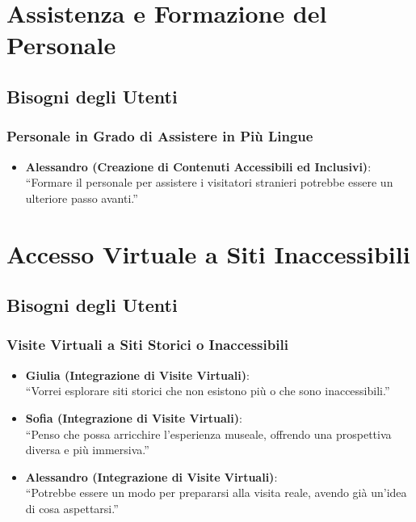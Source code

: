 \documentclass{article}
\begin{document}
\section{Assistenza e Formazione del Personale}

\subsection{Bisogni degli Utenti}

\subsubsection{Personale in Grado di Assistere in Più Lingue}

\begin{itemize}
    \item \textbf{Alessandro (Creazione di Contenuti Accessibili ed Inclusivi)}:\\
    ``Formare il personale per assistere i visitatori stranieri potrebbe essere un ulteriore passo avanti.''
\end{itemize}

\section{Accesso Virtuale a Siti Inaccessibili}

\subsection{Bisogni degli Utenti}

\subsubsection{Visite Virtuali a Siti Storici o Inaccessibili}

\begin{itemize}
    \item \textbf{Giulia (Integrazione di Visite Virtuali)}:\\
    ``Vorrei esplorare siti storici che non esistono più o che sono inaccessibili.''
    \item \textbf{Sofia (Integrazione di Visite Virtuali)}:\\
    ``Penso che possa arricchire l'esperienza museale, offrendo una prospettiva diversa e più immersiva.''
    \item \textbf{Alessandro (Integrazione di Visite Virtuali)}:\\
    ``Potrebbe essere un modo per prepararsi alla visita reale, avendo già un'idea di cosa aspettarsi.''
\end{itemize}
\end{document}
